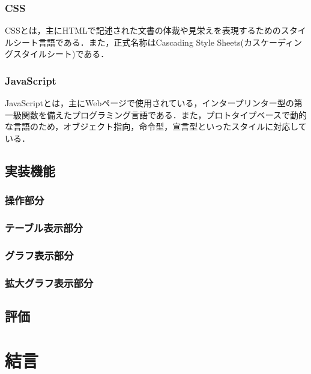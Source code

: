 \documentclass[a4paper, 12pt]{ltjsarticle}
\begin{document}
\subsubsection{CSS}
CSSとは，主にHTMLで記述された文書の体裁や見栄えを表現するためのスタイルシート言語である．また，正式名称はCascading Style Sheets(カスケーディングスタイルシート)である．
\subsubsection{JavaScript}
JavaScriptとは，主にWebページで使用されている，インタープリンター型の第一級関数を備えたプログラミング言語である．また，プロトタイプベースで動的な言語のため，オブジェクト指向，命令型，宣言型といったスタイルに対応している．
\clearpage
\subsection{実装機能}
\subsubsection{操作部分}
\subsubsection{テーブル表示部分}
\subsubsection{グラフ表示部分}
\subsubsection{拡大グラフ表示部分}
\subsection{評価}
\clearpage
\section{結言}
\clearpage

\end{document}

